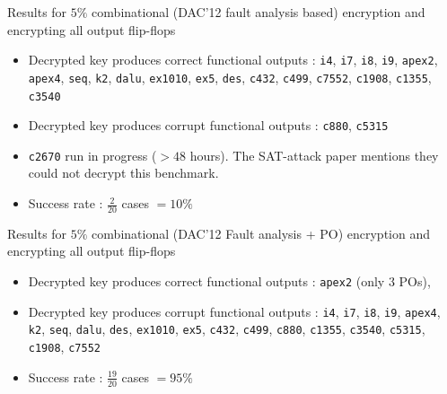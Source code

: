 \begin{frame}{Results for $5\%$ combinational (DAC'12 fault analysis based) encryption and encrypting all output flip-flops}
\begin{itemize}
\item Decrypted key produces correct functional outputs : \texttt{i4}, \texttt{i7}, \texttt{i8}, \texttt{i9}, \texttt{apex2}, \texttt{apex4}, \texttt{seq}, \texttt{k2}, \texttt{dalu}, \texttt{ex1010}, \texttt{ex5}, \texttt{des}, \texttt{c432}, \texttt{c499}, \texttt{c7552}, \texttt{c1908}, \texttt{c1355}, \texttt{c3540}
\item Decrypted key produces corrupt functional outputs : \texttt{c880}, \texttt{c5315}
\item \texttt{c2670} run in progress ($> 48$ hours). The SAT-attack paper mentions they could not decrypt this benchmark. 
\item Success rate : $\frac{2}{20}$ cases \alert{$= 10\%$}
\end{itemize}
\end{frame}

\begin{frame}{Results for $5\%$ combinational (DAC'12 Fault analysis + PO) encryption and encrypting all output flip-flops}
\begin{itemize}
\item Decrypted key produces correct functional outputs :    \texttt{apex2} (only 3 POs),   
\item Decrypted key produces corrupt functional outputs : \texttt{i4}, \texttt{i7}, \texttt{i8}, \texttt{i9}, \texttt{apex4}, \texttt{k2},  \texttt{seq}, \texttt{dalu}, \texttt{des},  \texttt{ex1010}, \texttt{ex5}, \texttt{c432}, \texttt{c499}, \texttt{c880}, \texttt{c1355}, \texttt{c3540}, \texttt{c5315}, \texttt{c1908},  \texttt{c7552} 
\item Success rate : $\frac{19}{20}$ cases \alert{$= 95\%$}
\end{itemize}
\end{frame}

